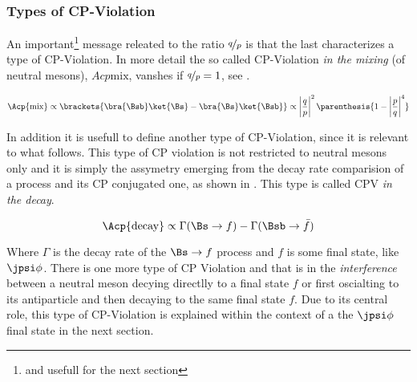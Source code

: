 \subsubsection{Types of CP-Violation}
An important\footnote{and usefull for the next section} message releated to the ratio $\nicefrac{q}{p}$ is that
the last characterizes a type of CP-Violation. In more detail the so called CP-Violation {\it in the mixing} (of neutral mesons),
$Acp{\text{mix}}$, vanshes if $\nicefrac{q}{p} = 1$, see .

\begin{equation}
\Acp{\text{mix}} \propto \brackets{\bra{\Bsb}\ket{\Bs} - \bra{\Bs}\ket{\Bsb}} \propto \left|\frac{q}{p}\right|^2 \parenthesis{ 1 - \left|\frac{p}{q}\right|^4}
\label{cpv_mixing}
\end{equation}

\noindent In addition it is usefull to define another type of CP-Violation, since it is relevant to what follows.
This type of CP violation is not restricted to neutral mesons only and it is simply the assymetry emerging from
the decay rate comparision of a process and its CP conjugated one, as shown in . This type is
called CPV {\it in the decay}.

\begin{equation}
\Acp{\text{decay}} \propto \Gamma(\Bs \rightarrow f) - \Gamma(\Bsb \rightarrow \bar{f})
\label{cpv_decay}
\end{equation}

\noindent Where $\Gamma$ is the decay rate of the $\Bs \rightarrow f$ process and $f$ is some final state,
like $\jpsi\phi$. There is one more type of CP Violation and that is in the {\it interference} between
a neutral meson decying directlly to a final state $f$ or first oscialting to its antiparticle and then decaying
to the same final state $f$. Due to its central role, this type of CP-Violation is explained within
the context of a the $\jpsi\phi$ final state in the next section.
